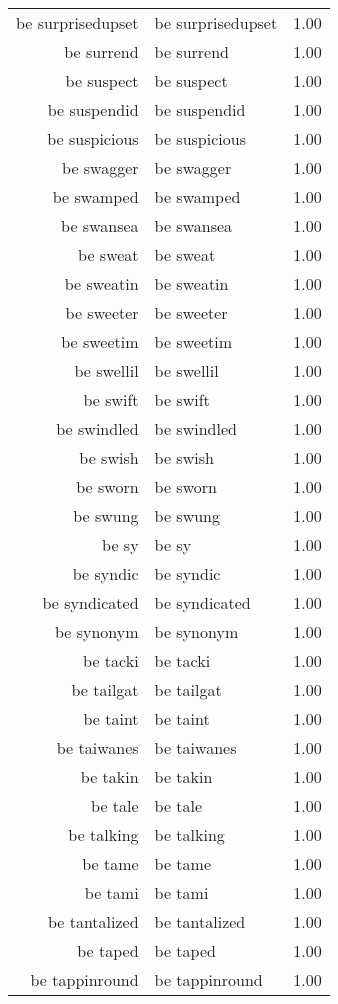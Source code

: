 \begin{table}[ht]
\begin{tabular}{rlr}
  be surprisedupset & be surprisedupset & 1.00 \\ 
  be surrend & be surrend & 1.00 \\ 
  be suspect & be suspect & 1.00 \\ 
  be suspendid & be suspendid & 1.00 \\ 
  be suspicious & be suspicious & 1.00 \\ 
  be swagger & be swagger & 1.00 \\ 
  be swamped & be swamped & 1.00 \\ 
  be swansea & be swansea & 1.00 \\ 
  be sweat & be sweat & 1.00 \\ 
  be sweatin & be sweatin & 1.00 \\ 
  be sweeter & be sweeter & 1.00 \\ 
  be sweetim & be sweetim & 1.00 \\ 
  be swellil & be swellil & 1.00 \\ 
  be swift & be swift & 1.00 \\ 
  be swindled & be swindled & 1.00 \\ 
  be swish & be swish & 1.00 \\ 
  be sworn & be sworn & 1.00 \\ 
  be swung & be swung & 1.00 \\ 
  be sy & be sy & 1.00 \\ 
  be syndic & be syndic & 1.00 \\ 
  be syndicated & be syndicated & 1.00 \\ 
  be synonym & be synonym & 1.00 \\ 
  be tacki & be tacki & 1.00 \\ 
  be tailgat & be tailgat & 1.00 \\ 
  be taint & be taint & 1.00 \\ 
  be taiwanes & be taiwanes & 1.00 \\ 
  be takin & be takin & 1.00 \\ 
  be tale & be tale & 1.00 \\ 
  be talking & be talking & 1.00 \\ 
  be tame & be tame & 1.00 \\ 
  be tami & be tami & 1.00 \\ 
  be tantalized & be tantalized & 1.00 \\ 
  be taped & be taped & 1.00 \\ 
  be tappinround & be tappinround & 1.00 \\ 

\end{tabular}
\end{table}
